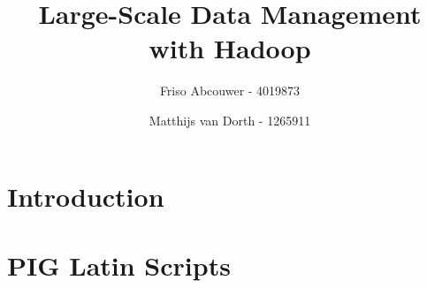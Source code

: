 \documentclass[11pt]{article}
\title{Large-Scale Data Management with Hadoop}
\author{Friso Abcouwer - 4019873 \and Matthijs van Dorth - 1265911}
\begin{document}
\maketitle

\section{Introduction}

\section{PIG Latin Scripts}

\end{document}
